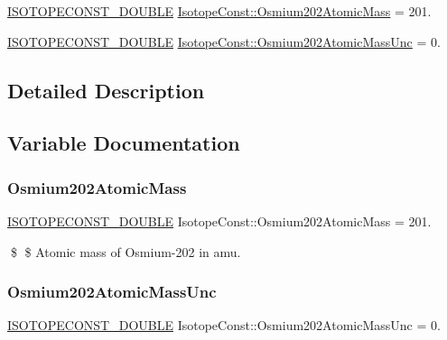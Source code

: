 \begin{DoxyCompactItemize}
\item 
\mbox{\hyperlink{group___isotope_const-_macros_ga8f45a7272ce02c0b4c65c44636ed719a}{I\+S\+O\+T\+O\+P\+E\+C\+O\+N\+S\+T\+\_\+\+D\+O\+U\+B\+LE}} \mbox{\hyperlink{group___isotope_const-_osmium-_os202_ga71f2e38bf4aea395eaf5f3160bce42d5}{Isotope\+Const\+::\+Osmium202\+Atomic\+Mass}} = 201.
\item 
\mbox{\hyperlink{group___isotope_const-_macros_ga8f45a7272ce02c0b4c65c44636ed719a}{I\+S\+O\+T\+O\+P\+E\+C\+O\+N\+S\+T\+\_\+\+D\+O\+U\+B\+LE}} \mbox{\hyperlink{group___isotope_const-_osmium-_os202_gac26745ca42d6c180e429533024cfc902}{Isotope\+Const\+::\+Osmium202\+Atomic\+Mass\+Unc}} = 0.
\end{DoxyCompactItemize}


\subsection{Detailed Description}


\subsection{Variable Documentation}
\mbox{\label{group___isotope_const-_osmium-_os202_ga71f2e38bf4aea395eaf5f3160bce42d5}} 
\subsubsection{\texorpdfstring{Osmium202\+Atomic\+Mass}{Osmium202AtomicMass}}
{\footnotesize\ttfamily \mbox{\hyperlink{group___isotope_const-_macros_ga8f45a7272ce02c0b4c65c44636ed719a}{I\+S\+O\+T\+O\+P\+E\+C\+O\+N\+S\+T\+\_\+\+D\+O\+U\+B\+LE}} Isotope\+Const\+::\+Osmium202\+Atomic\+Mass = 201.}

\$ \$ Atomic mass of Osmium-\/202 in amu. \mbox{\label{group___isotope_const-_osmium-_os202_gac26745ca42d6c180e429533024cfc902}} 
\subsubsection{\texorpdfstring{Osmium202\+Atomic\+Mass\+Unc}{Osmium202AtomicMassUnc}}
{\footnotesize\ttfamily \mbox{\hyperlink{group___isotope_const-_macros_ga8f45a7272ce02c0b4c65c44636ed719a}{I\+S\+O\+T\+O\+P\+E\+C\+O\+N\+S\+T\+\_\+\+D\+O\+U\+B\+LE}} Isotope\+Const\+::\+Osmium202\+Atomic\+Mass\+Unc = 0.}

